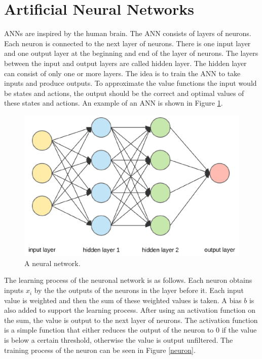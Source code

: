 \section{Artificial Neural Networks}

ANNs are inspired by the human brain. 
The ANN consists of layers of neurons. Each neuron is connected to the next layer of neurons. There is one input layer and one output layer at the beginning and end of the layer of neurons. The layers between the input and output layers are called hidden layer. The hidden layer can consist of only one or more layers. The idea is to train the ANN to take inputs and produce outputs. To approximate the value functions the input would be states and actions, the output should be the correct and optimal values of these states and actions. An example of an ANN is shown in Figure \ref{neuralnet}.

\begin{figure} [h]
	\centering
	\includegraphics[width=1\textwidth]{figures/neural_network.pdf}
	\caption{A neural network. \cite{neural_networkpng}}
	\label{neuralnet}
\end{figure}

\vspace{0.5cm}

The learning process of the neuronal network is as follows. Each neuron obtains inputs $x_i$ by the the outputs of the neurons in the layer before it. Each input value is weighted and then the sum of these weighted values is taken. A bias $b$ is also added to support the learning process. After using an activation function on the sum, the value is output to the next layer of neurons. The activation function is a simple function that either reduces the output of the neuron to 0 if the value is below a certain threshold, otherwise the value is output unfiltered.
The training process of the neuron can be seen in Figure \ref{neuron}.

